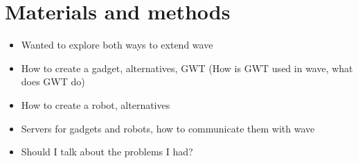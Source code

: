 \newpage
\section{Materials and methods}

\begin{itemize}
  \item Wanted to explore both ways to extend wave
  \item How to create a gadget, alternatives, GWT (How is GWT used in wave, what does GWT do)
  \item How to create a robot, alternatives
  \item Servers for gadgets and robots, how to communicate them with wave
  \item Should I talk about the problems I had?
\end{itemize}
